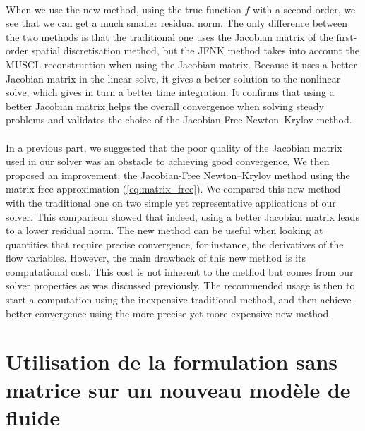         \paragraph{}
        When we use the new method, using the true function $f$ with a second-order, we see that we can get a much smaller residual norm.
        The only difference between the two methods is that the traditional one uses the Jacobian matrix of the first-order spatial discretisation method, but the JFNK method takes into account the MUSCL reconstruction when using the Jacobian matrix.
        Because it uses a better Jacobian matrix in the linear solve, it gives a better solution to the nonlinear solve, which gives in turn a better time integration.
        It confirms that using a better Jacobian matrix helps the overall convergence when solving steady problems and validates the choice of the Jacobian-Free Newton--Krylov method.


    \paragraph{}
    In a previous part, we suggested that the poor quality of the Jacobian matrix used in our solver was an obstacle to achieving good convergence.
    We then proposed an improvement: the Jacobian-Free Newton--Krylov method using the matrix-free approximation (\ref{eq:matrix_free}).
    We compared this new method with the traditional one on two simple yet representative applications of our solver.
    This comparison showed that indeed, using a better Jacobian matrix leads to a lower residual norm.
    The new method can be useful when looking at quantities that require precise convergence, for instance, the derivatives of the flow variables.
    However, the main drawback of this new method is its computational cost.
    This cost is not inherent to the method but comes from our solver properties as was discussed previously.
    The recommended usage is then to start a computation using the inexpensive traditional method, and then achieve better convergence using the more precise yet more expensive new method.


  \section{Utilisation de la formulation sans matrice sur un nouveau modèle de fluide}

